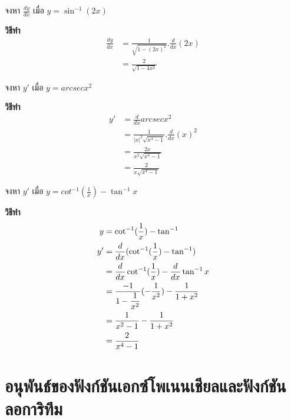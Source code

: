 \documentclass[
]{book}
\begin{document}
จงหา \(\displaystyle \frac{dy}{dx}\) เมื่อ \(y=\sin^{-1}(2x)\)

\textbf{วิธีทำ} \begin{equation}   \begin{aligned}
 \displaystyle
\frac{dy}{dx}&=\frac{1}{\sqrt{1-(2x)^{2}}}.\frac{d}{dx}(2x)\\
&=\frac{2}{\sqrt{1-4x^{2}}}
  \end{aligned} \end{equation}

จงหา \(y'\) เมื่อ \(y=arcsec x^{2}\)

\textbf{วิธีทำ} \begin{equation}   \begin{aligned}
 \displaystyle y'&=\frac{d}{dx}arcsec
x^{2}\\
&=\displaystyle \frac{1}{|x|^{2}\sqrt{x^{4}-1}}.\frac{d}{dx}(x)^{2}\\
&=\displaystyle \frac{2x}{x^{2}\sqrt{x^{4}-1}}\\
&=\displaystyle \frac{2}{x\sqrt{x^{4}-1}}
  \end{aligned} \end{equation}

จงหา \(y'\) เมื่อ \(y=cot^{-1}\displaystyle(\frac{1}{x})-\tan^{-1}x\)

\textbf{วิธีทำ} \begin{equation}   \begin{aligned}
\displaystyle y&=\cot^{-1}(\frac{1}{x})-\tan^{-1}\\
\displaystyle y'&=\frac{d}{dx}(\cot^{-1}(\frac{1}{x})-\tan^{-1})\\
\displaystyle &=\frac{d}{dx}\cot^{-1}(\displaystyle
\frac{1}{x})-\frac{d}{dx}\tan^{-1}x\\
\displaystyle &=\frac{-1}{1-\displaystyle
\frac{1}{x^{2}}}(-\frac{1}{x^{2}})-\frac{1}{1+x^{2}}\\
\displaystyle &=\frac{1}{x^{2}-1}-\frac{1}{1+x^{2}}\\
\displaystyle &=\frac{2}{x^{4}-1}
  \end{aligned} \end{equation}

\section{อนุพันธ์ของฟังก์ชันเอกซ์โพเนนเชียลและฟังก์ชันลอการิทึม}\label{uxe2duxe19uxe1euxe19uxe18uxe02uxe2duxe07uxe1fuxe07uxe01uxe0auxe19uxe40uxe2duxe01uxe0buxe42uxe1euxe40uxe19uxe19uxe40uxe0auxe22uxe25uxe41uxe25uxe30uxe1fuxe07uxe01uxe0auxe19uxe25uxe2duxe01uxe32uxe23uxe17uxe21}
\end{document}
